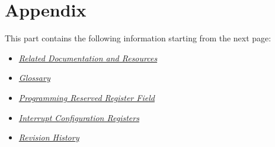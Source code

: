 \documentclass[openany, 10pt]{book}
\begin{document}


\part{Appendix}\label{appendix}

This part contains the following information starting from the next page:

\begin{itemize}
    \item \hyperref[sec:resources]{\textit{Related Documentation and Resources}}
    \item \hyperref[glossary]{\textit{Glossary}}
    \item \hyperref[programming-reserved-field]{\textit{Programming Reserved Register Field}}
    \item \hyperref[interrupt-config-registers]{\textit{Interrupt Configuration Registers}}
    \item \hyperref[revision-history]{\textit{Revision History}}
\end{itemize}



\clearpage


\clearpage


\clearpage


\clearpage


\clearpage


\clearpage

\end{document}
